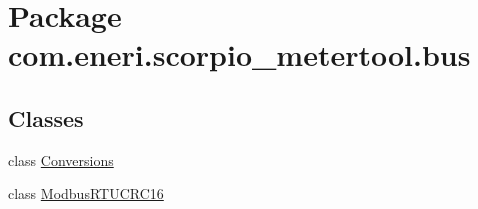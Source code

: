 \hypertarget{namespacecom_1_1eneri_1_1scorpio__metertool_1_1bus}{}\section{Package com.\+eneri.\+scorpio\+\_\+metertool.\+bus}
\label{namespacecom_1_1eneri_1_1scorpio__metertool_1_1bus}
\subsection*{Classes}
\begin{DoxyCompactItemize}
\item 
class \hyperlink{classcom_1_1eneri_1_1scorpio__metertool_1_1bus_1_1_conversions}{Conversions}
\item 
class \hyperlink{classcom_1_1eneri_1_1scorpio__metertool_1_1bus_1_1_modbus_r_t_u_c_r_c16}{Modbus\+R\+T\+U\+C\+R\+C16}
\end{DoxyCompactItemize}

